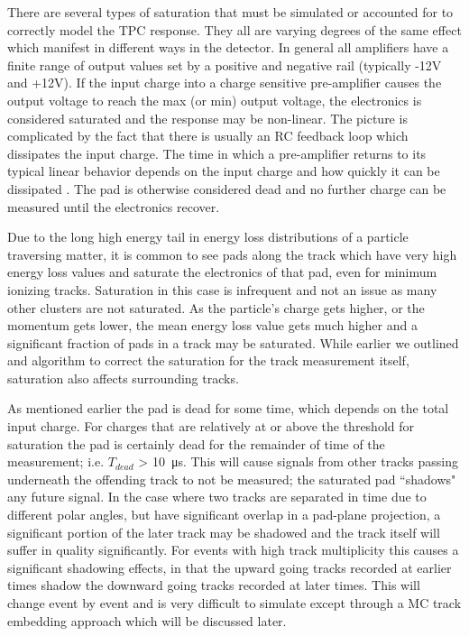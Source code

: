 
There are several types of saturation that must be simulated or accounted for to correctly model the TPC response. They all are varying degrees of the same effect which manifest in different ways in the detector. In general all amplifiers have a finite range of output values set by a positive and negative rail (typically -12V and +12V). If the input charge into a charge sensitive pre-amplifier causes the output voltage to reach the max (or min) output voltage, the electronics is considered saturated and the response may be non-linear. The picture is complicated by the fact that there is usually an RC feedback loop which dissipates the input charge. The time in which a pre-amplifier returns to its typical linear behavior depends on the input charge and how quickly it can be dissipated \cite{akiGET}. The pad is otherwise considered dead and no further charge can be measured until the electronics recover. 
 
Due to the long high energy tail in energy loss distributions of a particle traversing matter, it is common to see pads along the track which have very high energy loss values and saturate the electronics of that pad, even for minimum ionizing tracks. Saturation in this case is infrequent and not an issue as many other clusters are not saturated. As the particle's charge gets higher, or the momentum gets lower, the mean energy loss value gets much higher and a significant fraction of pads in a track may be saturated. While earlier we outlined and algorithm to correct the saturation for the track measurement itself, saturation also affects surrounding tracks. 

As mentioned earlier the pad is dead for some time, which depends on the total input charge. For charges that are relatively at or above the threshold for saturation the pad is certainly dead for the remainder of time of the measurement; i.e. $T_{dead}$ > \SI{10}{\micro\second}. This will cause signals from other tracks passing underneath the offending track to not be measured; the saturated pad ``shadows" any future signal. In the case where two tracks are separated in time due to different polar angles, but have significant overlap in a pad-plane projection, a significant portion of the later track may be shadowed and the track itself will suffer in quality significantly. For events with high track multiplicity this causes a significant shadowing effects, in that the upward going tracks recorded at earlier times shadow the downward going tracks recorded at later times. This will change event by event and is very difficult to simulate except through a MC track embedding approach which will be discussed later. 

